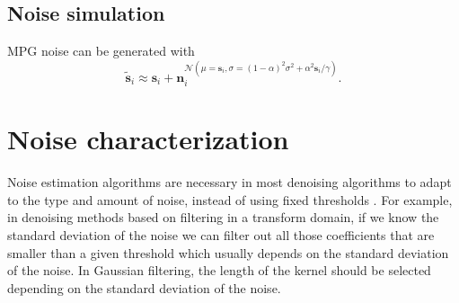








\subsection{Noise simulation}
\gls{MPG} noise can be generated with
\begin{equation}
  \tilde{\mathbf{s}}_i \approx \mathbf{s}_i + \mathbf{n}_i^{\mathcal{N}(\mu=\mathbf{s}_i, \sigma= (1-\alpha)^2\sigma^2 + \alpha^2\mathbf{s}_i/\gamma)}.
  \label{eq:Poisson_simulation}
\end{equation}

\section{Noise characterization}

Noise estimation algorithms are necessary in most denoising algorithms
to adapt to the type and amount of noise, instead of using fixed
thresholds \cite{immerkaer1996fast}. For example, in denoising methods
based on filtering in a transform domain, if we know the standard
deviation of the noise we can filter out all those coefficients that
are smaller than a given threshold which usually depends on the
standard deviation of the noise. In Gaussian filtering, the length of
the kernel should be selected depending on the standard deviation of
the noise.

